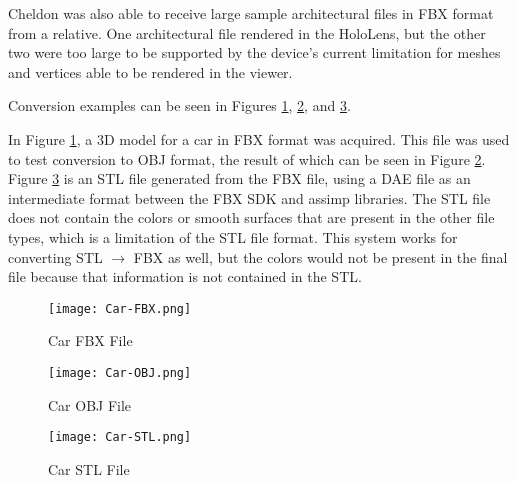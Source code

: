     Cheldon was also able to receive large sample architectural files in FBX format from a relative. One architectural file rendered in the HoloLens, but the other two were too large to be supported by the device's current limitation for meshes and vertices able to be rendered in the viewer.

    Conversion examples can be seen in Figures \ref{Car-FBX}, \ref{Car-OBJ}, and \ref{Car-STL}.  
    
    In Figure \ref{Car-FBX}, a 3D model for a car in FBX format was acquired. This file was used to test conversion to OBJ format, the result of which can be seen in Figure \ref{Car-OBJ}. Figure \ref{Car-STL} is an STL file generated from the FBX file, using a DAE file as an intermediate format between the FBX SDK and assimp libraries. The STL file does not contain the colors or smooth surfaces that are present in the other file types, which is a limitation of the STL file format. This system works for converting STL $\rightarrow$ FBX as well, but the colors would not be present in the final file because that information is not contained in the STL. 
    
\begin{figure}[H]
    \centering
    \texttt{[image: Car-FBX.png]}
    \caption{Car FBX File}
    \label{Car-FBX}
\end{figure}

\begin{figure}[H]
    \centering
    \texttt{[image: Car-OBJ.png]}
    \caption{Car OBJ File}
    \label{Car-OBJ}
\end{figure}

\begin{figure}[H]
    \centering
    \texttt{[image: Car-STL.png]}
    \caption{Car STL File}
    \label{Car-STL}
\end{figure}
